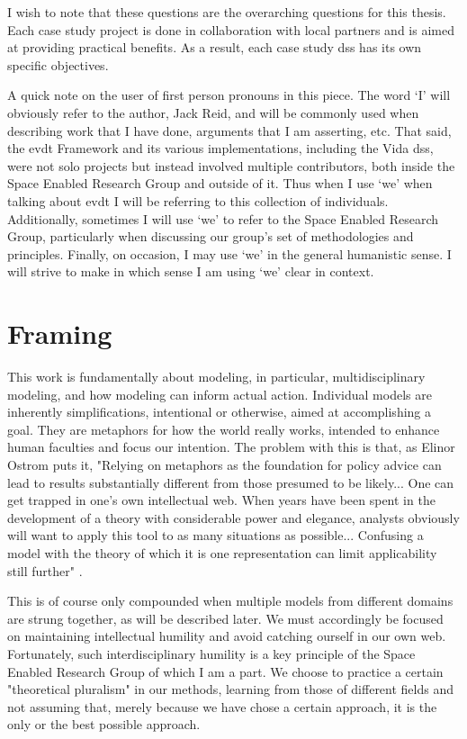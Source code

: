 I wish to note that these questions are the overarching questions for this thesis. Each case study project is done in collaboration with local partners and is aimed at providing practical benefits. As a result, each case study \ac{dss} has its own specific objectives.

A quick note on the user of first person pronouns in this piece. The word `I' will obviously refer to the author, Jack Reid, and will be commonly used when describing work that I have done, arguments that I am asserting, etc. That said, the \ac{evdt} Framework and its various implementations, including the Vida \ac{dss}, were not solo projects but instead involved multiple contributors, both inside the Space Enabled Research Group and outside of it. Thus when I use `we' when talking about \ac{evdt} I will be referring to this collection of individuals. Additionally, sometimes I will use `we' to refer to the Space Enabled Research Group, particularly when discussing our group's set of methodologies and principles. Finally, on occasion, I may use `we' in the general humanistic sense. I will strive to make in which sense I am using `we' clear in context.

\section{Framing}

This work is fundamentally about modeling, in particular, multidisciplinary modeling, and how modeling can inform actual action. Individual models are inherently simplifications, intentional or otherwise, aimed at accomplishing a goal. They are metaphors for how the world really works, intended to enhance human faculties and focus our intention. The problem with this is that, as Elinor Ostrom puts it, "Relying on metaphors as the foundation for policy advice can lead to results substantially different from those presumed to be likely... One can get trapped in one's own intellectual web. When years have been spent in the development of a theory with considerable power and elegance, analysts obviously will want to apply this tool to as many situations as possible... Confusing a model with the theory of which it is one representation can limit applicability still further" \cite{ostromGoverningCommonsEvolution2015}. 

This is of course only compounded when multiple models from different domains are strung together, as will be described later. We must accordingly be focused on maintaining intellectual humility and avoid catching ourself in our own web. Fortunately, such interdisciplinary humility is a key principle of the Space Enabled Research Group of which I am a part. We choose to practice a certain "theoretical pluralism" \cite{turkleEmpathyDiariesMemoir2021} in our methods, learning from those of different fields and not assuming that, merely because we have chose a certain approach, it is the only or the best possible approach.

